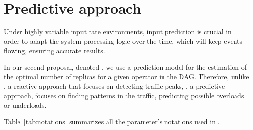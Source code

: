 \section{Predictive approach}
\label{predictive-approach}
Under highly variable input rate environments, input prediction is crucial in order to adapt the system processing logic over the time, which will keep events flowing, ensuring accurate results.

In our second proposal, denoted  \pSPS{}, we use a prediction model for the estimation of the optimal number of replicas for a given operator in the DAG. Therefore, unlike \rSPS{}, a reactive approach that focuses on detecting traffic peaks, \pSPS{}, a predictive approach, focuses on finding patterns in the traffic, predicting possible overloads or underloads.

Table~\ref{tab:notations} summarizes all the parameter's notations used in \pSPS{}. 

